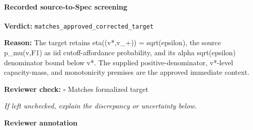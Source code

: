 \documentclass[10pt]{article}
\newcommand{\reviewerbox}{%
  \par\noindent\fbox{\parbox{0.96\linewidth}{\rule{0pt}{0.38in}}}\par
}
\newcommand{\reviewmatch}[1]{%
  \par\noindent\textbf{Reviewer check:} $\square$\; #1\par
  \noindent\emph{If left unchecked, explain the discrepancy or uncertainty below.}\par
}
\begin{document}
\paragraph{Recorded source-to-Spec screening}
\textbf{Verdict:} \texttt{matches\_approved\_corrected\_target}
\\
{\raggedright
\textbf{Reason:} The target retains eta((v*,v\_\allowbreak{}+)) = sqrt(epsilon), the source p\_\allowbreak{}mu(v,F1) as iid cutoff-\allowbreak{}affordance probability, and its alpha sqrt(epsilon) denominator bound below v*.\allowbreak{} The supplied positive-\allowbreak{}denominator, v*-\allowbreak{}level capacity-\allowbreak{}mass, and monotonicity premises are the approved immediate context.\allowbreak{}
\par}
\reviewmatch{Matches formalized target}
\noindent\textbf{Reviewer annotation}\par
\reviewerbox
\end{document}
